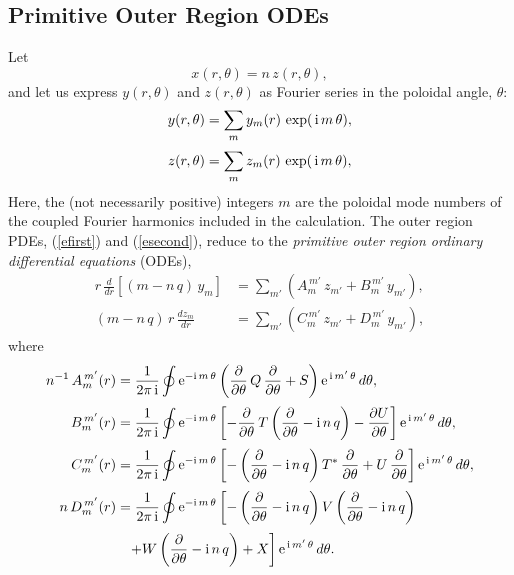 \documentclass[12pt,prb,aps]{revtex4-1}
\begin{document}
\subsection{Primitive Outer Region ODEs}\label{ode1}
Let
\begin{equation}\label{e79o}
x(r,\theta) = n\,z(r,\theta),
\end{equation}
and
let us express $y(r,\theta)$ and $z(r,\theta)$ as  Fourier series in the poloidal angle, $\theta$:
\begin{align}
y(r,\theta)&= \sum_{m}y_m(r)\,\exp(\,{\rm i}\,m\,\theta),\\[0.5ex]
z(r,\theta) &= \sum_{m}z_m(r)\,\exp(\,{\rm i}\,m\,\theta),\label{e97}
\end{align}
Here, the  (not necessarily positive) integers $m$ are the  poloidal mode numbers of the coupled Fourier harmonics included in the calculation. 
The outer region PDEs, (\ref{efirst}) and (\ref{esecond}),  reduce to the {\em primitive outer region ordinary differential equations}\/ (ODEs), \cite{connor,am1,am3}
\begin{align}\label{e41x}
r\,\frac{d}{dr}\left[(m-n\,q)\,y_m\right]&= \sum_{m'}\left(A_m^{\,m'}\,z_{m'}+B_m^{\,m'}\,y_{m'}\right),\\[0.5ex]
(m-n\,q)\,r\,\frac{dz_m}{dr} &= \sum_{m'}\left(C_{m}^{\,m'}\,z_{m'}+D_m^{\,m'}\,y_{m'}\right),\label{e42x}
\end{align}
where
\begin{align}
n^{-1}\,A_m^{\,m'}(r) &= \frac{1}{2\pi\,{\rm i}}\oint{\rm e}^{-{\rm i}\,m\,\theta}\left(\frac{\partial}{\partial\theta}\,Q\,\frac{\partial}{\partial\theta}+S\right){\rm e}^{\,{\rm i}\,m'\,\theta}\,d\theta,\\[0.5ex]
B_m^{\,m'}(r) &= \frac{1}{2\pi\,{\rm i}}\oint{\rm e}^{-{\rm i}\,m\,\theta}\left[-\frac{\partial}{\partial\theta}\,T\left(\frac{\partial}{\partial\theta}-{\rm i}\,n\,q\right)-\frac{\partial U}{\partial\theta}\right]{\rm e}^{\,{\rm i}\,m'\,\theta}\,d\theta,\\[0.5ex]
C_m^{\,m'}(r) &= \frac{1}{2\pi\,{\rm i}}\oint{\rm e}^{-{\rm i}\,m\,\theta}\left[-\left(\frac{\partial}{\partial\theta}-{\rm i}\,n\,q\right)T^\ast\,\frac{\partial}{\partial\theta}+U\,\frac{\partial}{\partial\theta}\right]{\rm e}^{\,{\rm i}\,m'\,\theta}\,d\theta,\\[0.5ex]
n\,D_m^{\,m'}(r)&= \frac{1}{2\pi\,{\rm i}}\oint{\rm e}^{-{\rm i}\,m\,\theta}\left[-\left(\frac{\partial}{\partial\theta}-{\rm i}\,n\,q\right)V\left(\frac{\partial}{\partial\theta}-{\rm i}\,n\,q\right)
\right. \nonumber\\[0.5ex]&\phantom{=}\left.+W\left(\frac{\partial}{\partial\theta}-{\rm i}\,n\,q\right)+ X\right]{\rm e}^{\,{\rm i}\,m'\,\theta}\,d\theta.
\end{align}
\end{document}
